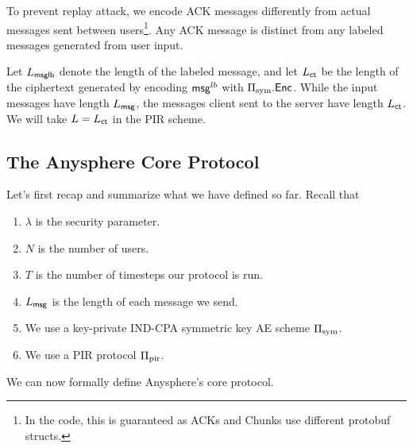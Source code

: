 To prevent replay attack, we encode ACK messages differently from actual messages sent between users\footnote{In the code, this is guaranteed as ACKs and Chunks use different protobuf structs.}. Any ACK message is distinct from any labeled messages generated from user input.

Let $L_{\mathsf{msglb}}$ denote the length of the labeled message, and let $L_{\mathsf{ct}}$ be the length of the ciphertext generated by encoding $\mathsf{msg}^{lb}$ with $\Pi_{\text{sym}}.\mathsf{Enc}$. While the input messages have length $L_{\mathsf{msg}}$, the messages client sent to the server have length $L_{\mathsf{ct}}$. We will take $L = L_{\mathsf{ct}}$ in the PIR scheme.
\subsection{The Anysphere Core Protocol}
Let's first recap and summarize what we have defined so far. Recall that
\begin{enumerate}
    \item $\lambda$ is the security parameter.
    \item $N$ is the number of users.
    \item $T$ is the number of timesteps our protocol is run.
    \item $L_{\mathsf{msg}}$ is the length of each message we send.
    \item We use a key-private IND-CPA symmetric key AE scheme $\Pi_{\text{sym}}$.
    \item We use a PIR protocol $\Pi_{\text{pir}}$.
\end{enumerate}
We can now formally define Anysphere's core protocol.
